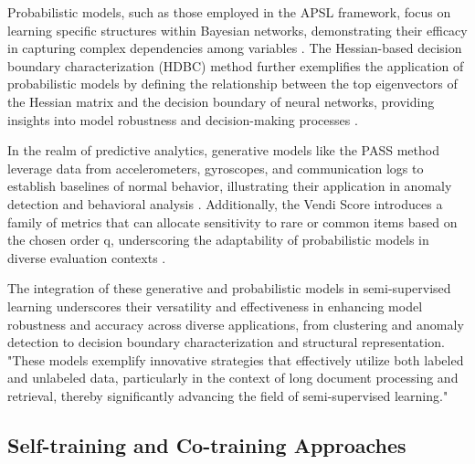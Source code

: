 Probabilistic models, such as those employed in the APSL framework, focus on learning specific structures within Bayesian networks, demonstrating their efficacy in capturing complex dependencies among variables \cite{ling2021bayesiannetworkstructurelearning}. The Hessian-based decision boundary characterization (HDBC) method further exemplifies the application of probabilistic models by defining the relationship between the top eigenvectors of the Hessian matrix and the decision boundary of neural networks, providing insights into model robustness and decision-making processes \cite{sabanayagam2023unveilinghessiansconnectiondecision}.

In the realm of predictive analytics, generative models like the PASS method leverage data from accelerometers, gyroscopes, and communication logs to establish baselines of normal behavior, illustrating their application in anomaly detection and behavioral analysis \cite{jeong2016predictiveanalyticsusingsmartphone}. Additionally, the Vendi Score introduces a family of metrics that can allocate sensitivity to rare or common items based on the chosen order q, underscoring the adaptability of probabilistic models in diverse evaluation contexts \cite{pasarkar2024cousinsvendiscorefamily}.

The integration of these generative and probabilistic models in semi-supervised learning underscores their versatility and effectiveness in enhancing model robustness and accuracy across diverse applications, from clustering and anomaly detection to decision boundary characterization and structural representation. "These models exemplify innovative strategies that effectively utilize both labeled and unlabeled data, particularly in the context of long document processing and retrieval, thereby significantly advancing the field of semi-supervised learning." \cite{ginzburg2021selfsuperviseddocumentsimilarityranking}


\subsection{Self-training and Co-training Approaches} \label{subsec:Self-training and Co-training Approaches}

